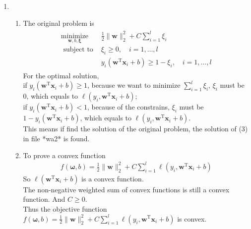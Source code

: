 \documentclass[a4paper]{article}
\begin{document}
\begin{enumerate}
\item 
\begin{enumerate}
  \item The original problem is
  \begin{equation*}
    \begin{aligned}
    \begin{array}{cl}{\underset{\boldsymbol{w}, b, \boldsymbol{\xi}}{\operatorname{minimize}}} & {\frac{1}{2}\|\boldsymbol{w}\|_{2}^{2}+C \sum_{i=1}^{l} \xi_{i}} \\ 
    {\text { subject to }} & {\xi_{i} \geq 0, \quad i=1, \ldots, l} \\
    {} & {y_{i}\left(\boldsymbol{w}^{\mathrm{T}} \boldsymbol{x}_{i}+b\right) \geq 1-\xi_{i}, \quad i=1, \ldots, l}\end{array}
    \end{aligned}
  \end{equation*}
  For the optimal solution, \\
  if $y_{i}\left(\boldsymbol{w}^{\mathrm{T}} \boldsymbol{x}_{i}+b\right) \geq 1$, because we want to minimize $\sum_{i=1}^{l} \xi_{i}$, $\xi_{i}$ must be 0, which equals to $\ell\left(y_{i}, \boldsymbol{w}^{\mathrm{T}} \boldsymbol{x}_{i}+b\right)$;\\
  if $y_{i}\left(\boldsymbol{w}^{\mathrm{T}} \boldsymbol{x}_{i}+b\right) < 1$, because of the constrains, $\xi_{i}$ must be $1-y_{i}\left(\boldsymbol{w}^{\mathrm{T}} \boldsymbol{x}_{i}+b\right)$, which equals to $\ell\left(y_{i}, \boldsymbol{w}^{\mathrm{T}} \boldsymbol{x}_{i}+b\right)$.\\
  This means if find the solution of the original problem, the solution of (3) in file *wa2* is found.
  

  \item To prove a convex function
  \begin{equation*}
    \begin{aligned}
      f(\boldsymbol{\omega} ,b) = \frac{1}{2}\|\boldsymbol{w}\|_{2}^{2}+C \sum_{i=1}^{l} \ell\left(y_{i}, \boldsymbol{w}^{\mathrm{T}} \boldsymbol{x}_{i}+b\right)
    \end{aligned}
  \end{equation*}
  So $\ell(\boldsymbol{w}^{\mathrm{T}} \boldsymbol{x}_{i}+b)$ is a convex function.\\
  The non-negative weighted sum of convex functions is still a convex function. And $C \geq 0$. \\
  Thus the objective function $f(\boldsymbol{\omega} ,b) = \frac{1}{2}\|\boldsymbol{w}\|_{2}^{2}+C \sum_{i=1}^{l} \ell\left(y_{i}, \boldsymbol{w}^{\mathrm{T}} \boldsymbol{x}_{i}+b\right)$ is convex.
\end{enumerate}

\end{enumerate}
  
  
  
\end{document}
